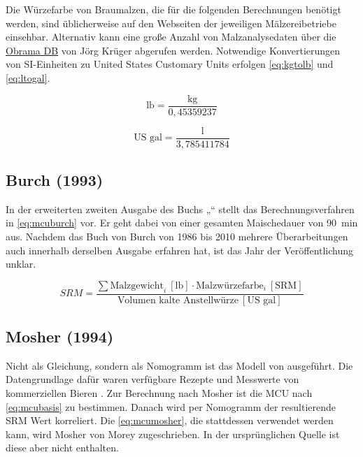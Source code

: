 \documentclass[a4paper,parskip=half]{scrartcl}
\newcommand{\SRM}{\mathit{SRM}}
\newcommand{\usrm}{\:[\textrm{SRM}]}
\newcommand{\ugal}{\:[\textrm{US gal}]}
\newcommand{\ulb}{\:[\textrm{lb}]}
\begin{document}
Die Würzefarbe von Braumalzen, die für die folgenden Berechnungen benötigt werden, sind üblicherweise auf den Webseiten der jeweiligen Mälzereibetriebe einsehbar. Alternativ kann eine große Anzahl von Malzanalysedaten über die \href{https://obrama.mueggelland.de}{Obrama DB} von Jörg Krüger abgerufen werden. Notwendige Konvertierungen von SI-Einheiten zu United States Customary Units erfolgen \autoref{eq:kgtolb} und \autoref{eq:ltogal}.

\begin{equation}
\text{lb} = \frac{\text{kg}}{0,45359237}
\label{eq:kgtolb}
\end{equation}

\begin{equation}
\text{US gal} = \frac{\text{l}}{3,785411784}
\label{eq:ltogal}
\end{equation}

\subsection*{Burch (1993)}

In der erweiterten zweiten Ausgabe des Buchs „“ stellt \textcite[102]{Burch2010} das Berechnungsverfahren in \autoref{eq:mcuburch} vor. Er geht dabei von einer gesamten Maischedauer von 90~min aus. Nachdem das Buch von Burch von 1986 bis 2010 mehrere Überarbeitungen auch innerhalb derselben Ausgabe erfahren hat, ist das Jahr der Veröffentlichung unklar.

\begin{equation}
\SRM = \frac{\sum \text{Malzgewicht}_i \ulb \cdot \text{Malzwürzefarbe}_i \usrm}{\text{Volumen kalte Anstellwürze} \ugal} 
\label{eq:mcuburch}
\end{equation}

\subsection*{Mosher (1994)}

Nicht als Gleichung, sondern als Nomogramm ist das Modell von \textcite[34]{Mosher1994} ausgeführt. Die Datengrundlage dafür waren verfügbare Rezepte und Messwerte von kommerziellen Bieren \parencite{Morey2004}. Zur Berechnung nach Mosher ist die MCU nach \autoref{eq:mcubasis} zu bestimmen. Danach wird per Nomogramm der resultierende SRM Wert korreliert. Die \autoref{eq:mcumosher}, die stattdessen verwendet werden kann, wird Mosher von Morey zugeschrieben. In der ursprünglichen Quelle ist diese aber nicht enthalten. 
\end{document}

